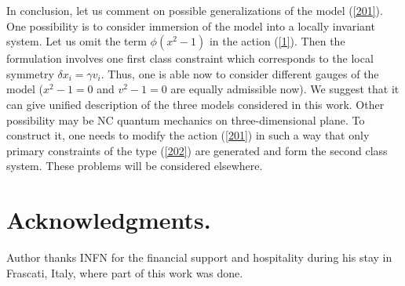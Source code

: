 \documentclass[paper a4]{article}
\begin{document}
In conclusion, let us comment on possible generalizations of the
model (\ref{201}). One possibility is to consider immersion of the model
into a locally invariant system. Let us omit the term $\phi(x^2-1)$
in the action (\ref{1}). Then the formulation involves one first class
constraint which corresponds to the local symmetry
$\delta x_i=\gamma v_i$. Thus, one is able now to consider different
gauges of the model ($x^2-1=0$ and $v^2-1=0$ are equally
admissible now). We suggest that it can give unified description of
the three models considered in this work. Other possibility may be
NC quantum mechanics on three-dimensional plane. To construct it, one
needs to modify the action (\ref{201}) in such a way that only primary
constraints of the type (\ref{202}) are generated and form the second
class system. These problems will be considered elsewhere.

\section{Acknowledgments.}
Author thanks INFN for the financial support and hospitality during
his stay in Frascati, Italy, where part of this work was done.
\end{document}
